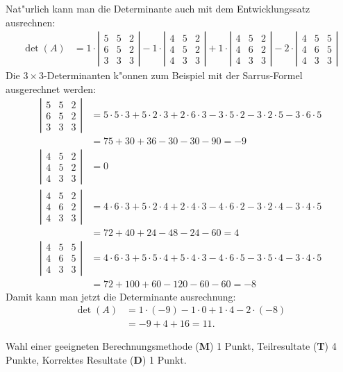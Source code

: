 \begin{loesung}
Nat"urlich kann man die Determinante auch mit dem Entwicklungssatz ausrechnen:
\begin{align*}
\det(A)
&=
1\cdot\left|\begin{matrix}
5&5&2\\
6&5&2\\
3&3&3
\end{matrix}\right|
-
1\cdot\left|\begin{matrix}
4&5&2\\
4&5&2\\
4&3&3
\end{matrix}\right|
+
1\cdot\left|\begin{matrix}
4&5&2\\
4&6&2\\
4&3&3
\end{matrix}\right|
-
2\cdot\left|\begin{matrix}
4&5&5\\
4&6&5\\
4&3&3
\end{matrix}\right|
\end{align*}
Die $3\times 3$-Determinanten k"onnen zum Beispiel mit der Sarrus-Formel
ausgerechnet werden:
\begin{align*}
\left|\begin{matrix}
5&5&2\\
6&5&2\\
3&3&3
\end{matrix}\right|
&=
5\cdot 5\cdot 3 + 5\cdot 2 \cdot3 + 2\cdot 6\cdot 3
-3\cdot 5\cdot 2-3\cdot 2\cdot 5-3\cdot 6\cdot5
\\
&=
75+30+36-30-30-90=-9
\\
\left|\begin{matrix}
4&5&2\\
4&5&2\\
4&3&3
\end{matrix}\right|
&=0
\\
\left|\begin{matrix}
4&5&2\\
4&6&2\\
4&3&3
\end{matrix}\right|
&=
4\cdot 6\cdot 3 + 5\cdot 2\cdot4+2\cdot 4\cdot 3
-4\cdot 6\cdot 2-3\cdot 2\cdot 4-3\cdot 4\cdot 5
\\
&=72+40+24-48-24-60=4
\\
\left|\begin{matrix}
4&5&5\\
4&6&5\\
4&3&3
\end{matrix}\right|
&=
4\cdot 6\cdot 3+5\cdot 5\cdot 4 +5\cdot 4\cdot 3
-4\cdot 6\cdot 5-3\cdot 5\cdot 4-3\cdot 4\cdot 5
\\
&= 72+100+60-120-60-60
=-8
\end{align*}
Damit kann man jetzt die  Determinante ausrechnung:
\begin{align*}
\det(A)
&=
1\cdot (-9)
-1\cdot 0
+1\cdot 4
-2\cdot (-8)
\\
&=-9+4+16=11.
\end{align*}
\end{loesung}

\begin{bewertung}
Wahl einer geeigneten Berechnungsmethode ({\bf M}) 1 Punkt,
Teilresultate ({\bf T}) 4 Punkte,
Korrektes Resultate ({\bf D}) 1 Punkt.
\end{bewertung}
